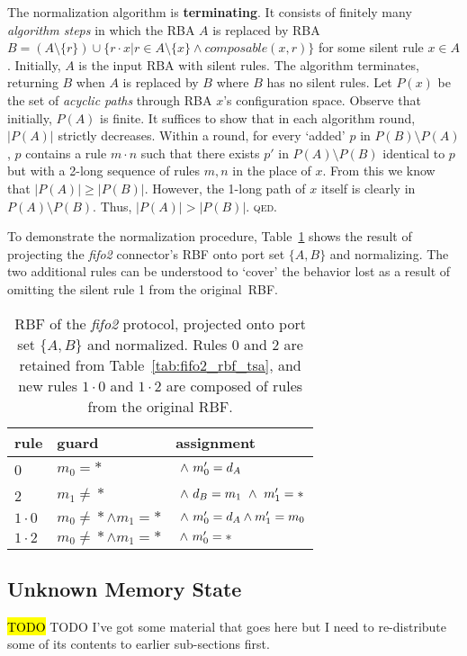 The normalization algorithm is \textbf{terminating}. It consists of finitely many \textit{algorithm steps} in which the RBA $A$ is replaced by RBA $B=(A \setminus{}\{r\}) \cup{} \{r\cdot{}x | r\in{} A\setminus{}\{x\} \wedge{} composable(x,r)\}$ for some silent rule $x \in{} A$. Initially, $A$ is the input RBA with silent rules. The algorithm terminates, returning $B$ when $A$ is replaced by $B$ where $B$ has no silent rules. Let $P(x)$ be the set of \textit{acyclic paths} through RBA $x$'s configuration space. Observe that initially, $P(A)$ is finite. It suffices to show that in each algorithm round, $|P(A)|$ strictly decreases. Within a round, for every `added' $p$ in $P(B)\setminus{}P(A)$, $p$ contains a rule $m\cdot{}n$ such that there exists $p'$ in $P(A)\setminus{}P(B)$ identical to $p$ but with a 2-long sequence of rules $m, n$ in the place of $x$. From this we know that $|P(A)| \geq |P(B)|$. However, the 1-long path of $x$ itself is clearly in $P(A)\setminus{} P(B)$. Thus, $|P(A)| > |P(B)|$. \textsc{qed}.

To demonstrate the normalization procedure, Table~\ref{tab:fifo2_rbf_tsa_norm} shows the result of projecting the \textit{fifo2} connector's RBF onto port set $\{A,B\}$ and normalizing. The two additional rules can be understood to `cover' the behavior lost as a result of omitting the silent rule 1 from the original~RBF.


\begin{table}
	\centering
	\begin{tabular}{l|ll|}
		rule & guard & assignment \\
		\hline
		0 & $m_0=*$ & $\ \wedge{}\ {}m_0'=d_A$\\
		2 & $m_1\neq{}*$ & $\ \wedge{}\ {}d_B=m_1\ \wedge{}\ {}m_1'=*$ \\
		\hline
		$1\cdot{}0$ & $m_0\neq{}*\wedge{}m_1=*$ & $\ \wedge{}\ {}m_0'=d_A\wedge{}m_1'=m_0$ \\
		$1\cdot{}2$ & $m_0\neq{}*\wedge{}m_1=*$ & $\ \wedge{}\ {}m_0'=*$ \\
		\hline
	\end{tabular}
	\caption[RBF of fifo2 connector, projected and normalized.]{RBF of the \textit{fifo2} protocol, projected onto port set $\{A,B\}$ and normalized. Rules 0 and 2 are retained from Table~\ref{tab:fifo2_rbf_tsa}, and new rules $1\cdot{}0$ and $1\cdot{}2$ are composed of rules from the original RBF.}
	\label{tab:fifo2_rbf_tsa_norm}
\end{table}


\subsection{Unknown Memory State}
\hl{TODO}
TODO I've got some material that goes here but I need to re-distribute some of its contents to earlier sub-sections first.

